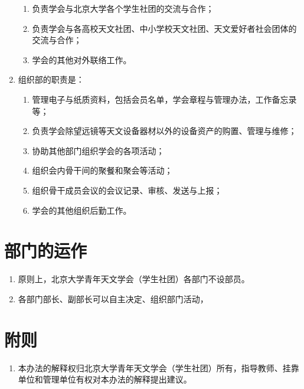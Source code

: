 \begin{enumerate}[resume]
    \begin{enumerate}
        \item 负责学会与北京大学各个学生社团的交流与合作；
        \item 负责学会与各高校天文社团、中小学校天文社团、天文爱好者社会团体的交流与合作；
        \item 学会的其他对外联络工作。
    \end{enumerate}
    
    \item 组织部的职责是：
    
    \begin{enumerate}
        \item 管理电子与纸质资料，包括会员名单，学会章程与管理办法，工作备忘录等；
        \item 负责学会除望远镜等天文设备器材以外的设备资产的购置、管理与维修；
        \item 协助其他部门组织学会的各项活动；
        \item 组织会内骨干间的聚餐和聚会等活动；
        \item 组织骨干成员会议的会议记录、审核、发送与上报；
        \item 学会的其他组织后勤工作。
    \end{enumerate}

\end{enumerate}

\section{部门的运作}

\begin{enumerate}[resume]
    \item 原则上，北京大学青年天文学会（学生社团）各部门不设部员。
    
    \item 各部门部长、副部长可以自主决定、组织部门活动，
\end{enumerate}

\section{附则}

\begin{enumerate}[resume]
    \item 本办法的解释权归北京大学青年天文学会（学生社团）所有，指导教师、挂靠单位和管理单位有权对本办法的解释提出建议。
\end{enumerate}
